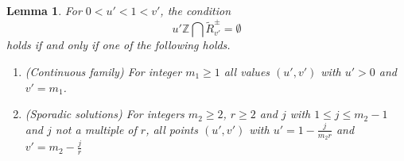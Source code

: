 \documentclass[12pt,letterpaper, reqno]{amsart}
\newtheorem{lem}[thm]{Lemma}
\theoremstyle{definition}
\theoremstyle{remark}
\newcommand{\ZZ}{\ensuremath{\mathbb{Z}}}
\newcommand{\uu}{{u'}}
\newcommand{\vv}{{v'}}
\begin{document}


\begin{lem}\label{lem:53aa}
For $0<\uu<1<\vv$, 
the condition
$${\uu}\ZZ \bigcap \widetilde{R}_\vv^{\pm} = \emptyset$$
holds if and only if one of the following holds.
\begin{enumerate}
\item[(a)]   (Continuous family) For integer $m_1 \ge 1$ all  values $(\uu, \vv)$ with $\uu>0$ and 
$\vv = {m_1}$.
\item[(b)] (Sporadic solutions) For integers $m_2 \ge 2$,   $r \ge 2$ and $j$ with $1\le j\le m_2-1$ and $j$ not a multiple of $r$,
all points  $(\uu, \vv)$ with
$\uu= 1 - \frac{j}{m_2r}$ and  $\vv = m_2-\frac{j}{r}$ \end{enumerate}
\end{lem}
\end{document}
